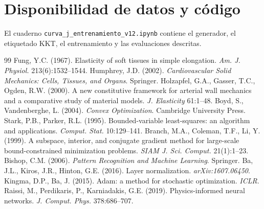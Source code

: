\documentclass[11pt,twoside]{article}
\theoremstyle{definition}
\theoremstyle{remark}
\begin{document}
\section*{Disponibilidad de datos y código}
El cuaderno \texttt{curva\_j\_entrenamiento\_v12.ipynb} contiene el generador, el etiquetado KKT, el entrenamiento y las evaluaciones descritas.

\begin{thebibliography}{99}
 Fung, Y.C. (1967). Elasticity of soft tissues in simple elongation. \emph{Am. J. Physiol.} 213(6):1532--1544.
 Humphrey, J.D. (2002). \emph{Cardiovascular Solid Mechanics: Cells, Tissues, and Organs}. Springer.
 Holzapfel, G.A., Gasser, T.C., Ogden, R.W. (2000). A new constitutive framework for arterial wall mechanics and a comparative study of material models. \emph{J. Elasticity} 61:1--48.
 Boyd, S., Vandenberghe, L. (2004). \emph{Convex Optimization}. Cambridge University Press.
 Stark, P.B., Parker, R.L. (1995). Bounded-variable least-squares: an algorithm and applications. \emph{Comput. Stat.} 10:129--141.
 Branch, M.A., Coleman, T.F., Li, Y. (1999). A subspace, interior, and conjugate gradient method for large-scale bound-constrained minimization problems. \emph{SIAM J. Sci. Comput.} 21(1):1--23.
 Bishop, C.M. (2006). \emph{Pattern Recognition and Machine Learning}. Springer.
 Ba, J.L., Kiros, J.R., Hinton, G.E. (2016). Layer normalization. \emph{arXiv:1607.06450}.
 Kingma, D.P., Ba, J. (2015). Adam: a method for stochastic optimization. \emph{ICLR}.
 Raissi, M., Perdikaris, P., Karniadakis, G.E. (2019). Physics-informed neural networks. \emph{J. Comput. Phys.} 378:686--707.
\end{thebibliography}
\end{document}
